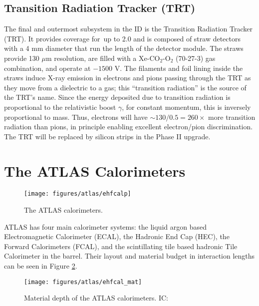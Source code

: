 \subsection{Transition Radiation Tracker (TRT)}
The final and outermost subsystem in the ID is the Transition Radiation Tracker (TRT).  It provides coverage for \aeta\,up to 2.0 and is composed of straw detectors with a 4 mm diameter that run the length of the detector module.  The straws provide 130 $\mu$m resolution, are filled with a Xe-CO$_2$-O$_2$ (70-27-3) gas combination, and operate at $-1500$ V.  The filaments and foil lining inside the straws induce X-ray emission in electrons and pions passing through the TRT as they move from a dielectric to a gas; this ``transition radiation'' is the source of the TRT's name.  Since the energy deposited due to transition radiation is proportional to the relativistic boost $\gamma$, for constant momentum, this is inversely proportional to mass.  Thus, electrons will have $\sim 130/0.5=260\times$ more transition radiation than pions, in principle enabling excellent electron/pion discrimination.  The TRT will be replaced by silicon strips in the Phase II upgrade.


\section{The ATLAS Calorimeters}
\begin{figure}[!htbp]\captionsetup{justification=centering}
  \centering
  \texttt{[image: figures/atlas/ehfcalp]}
  \caption{The ATLAS calorimeters.}
  \label{fig:atlascal}
\end{figure}

ATLAS has four main calorimeter systems: the liquid argon based Electromagnetic Calorimeter (ECAL), the Hadronic End Cap (HEC), the Forward Calorimeters (FCAL), and the scintillating tile based hadronic Tile Calorimeter in the barrel.  Their layout and material budget in interaction lengths can be seen in Figure \ref{fig:calbudget}.
\begin{figure}[!htbp]\captionsetup{justification=centering}
  \centering
  \texttt{[image: figures/atlas/ehfcal\_mat]}
  \caption{Material depth of the ATLAS calorimeters. IC: \cite{jinstpaper}}
  \label{fig:calbudget}
\end{figure}

